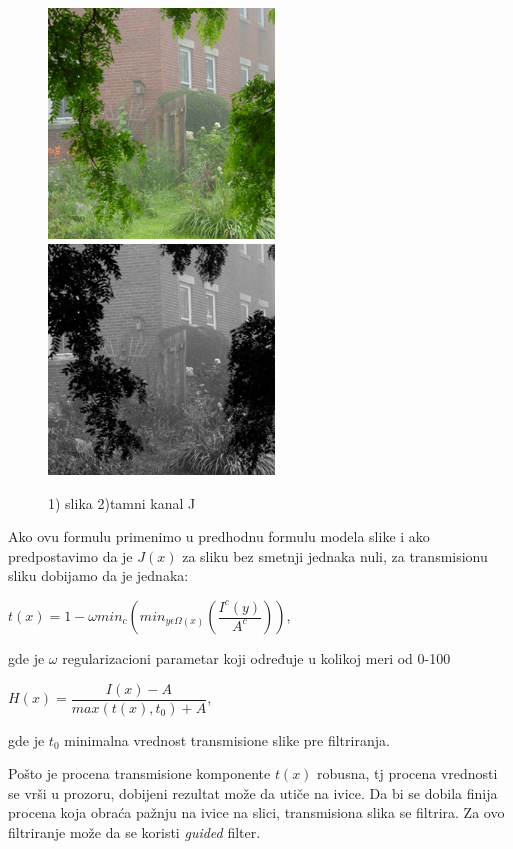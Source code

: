 \documentclass[a4paper,12pt,titlepage]{article}
\begin{document}
\begin{figure}[ht!]
\centering
\includegraphics[width=60mm]{img/haze.png}
\includegraphics[width=60mm]{img/hazeDC.png}
\caption{1) slika 2)tamni kanal J}
\label{overflow}
\end{figure}   

Ako ovu formulu primenimo u predhodnu formulu modela slike i ako predpostavimo da je $J(x)$ za sliku bez smetnji jednaka nuli, za transmisionu sliku dobijamo da je jednaka:

\begin{center}
$t(x) = 1 - \omega min_c ( min_{y \epsilon \Omega (x)} (\dfrac{I^c(y)}{A^c}))$,
\end{center}

gde je $\omega$ regularizacioni parametar koji određuje u kolikoj meri od 0-100 %

\begin{center}
$H(x) = \dfrac{I(x) - A}{max(t(x), t_0) + A}$,
\end{center}

gde je $t_0$ minimalna vrednost transmisione slike pre filtriranja.

Pošto je procena transmisione komponente $t(x)$ robusna, tj procena vrednosti  se vrši u prozoru, dobijeni rezultat može da utiče na ivice. Da bi se dobila finija procena koja obraća pažnju na ivice na slici, transmisiona slika se filtrira. Za ovo filtriranje može da se koristi \emph{guided} filter. 
\end{document}
